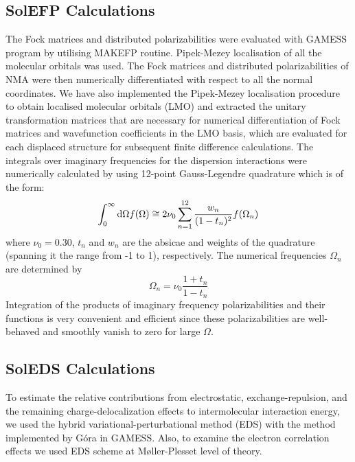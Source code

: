 \documentclass[b5paper,oneside,fleqn,11pt]{book}
\begin{document}
\begin{appendices}
\begin{refsection}
\subsection{SolEFP Calculations}

The Fock matrices and distributed polarizabilities were
evaluated with GAMESS program by utilising MAKEFP routine. \citep{GAMESS.JCC.1993}
Pipek\hyp{}Mezey localisation \citep{Pipek.Mezey.JCP.1989}
of all the molecular orbitals was
used. The Fock matrices and distributed polarizabilities of
NMA were then numerically differentiated with respect to all
the normal coordinates. We have also implemented the Pipek\hyp{}Mezey 
localisation procedure to obtain localised molecular
orbitals (LMO) and extracted the unitary transformation matrices
that are necessary for numerical differentiation of Fock
matrices and wavefunction coefficients in the LMO basis,
which are evaluated for each displaced structure for subsequent
finite difference calculations. 
The integrals over
imaginary frequencies for the dispersion interactions were
numerically calculated by using 12\hyp{}point Gauss\hyp{}Legendre
quadrature which is of the form: \citep{Adamovic.Gordon.MolPhys.2005}
%
\begin{equation}
 \int_0^\infty {\rm d}\Omega f(\Omega) \cong 2\nu_0\sum_{n=1}^{12} \frac{w_n}{(1-t_n)^2}f(\Omega_n)
\end{equation}
%
where $\nu_0=0.30$, $t_n$ and $w_n$ are the
absicae and weights of the quadrature (spanning it the
range from -1 to 1), respectively. 
The numerical
frequencies $\Omega_n$ are determined by 
%
\begin{equation}
 \Omega_n = \nu_0 \frac{1+t_n}{1-t_n}
\end{equation}
% 
Integration of the products of imaginary frequency
polarizabilities and their functions is very convenient
and efficient since
these polarizabilities are well\hyp{}behaved and
smoothly vanish to zero for large $\Omega$.

\subsection{SolEDS Calculations}

To estimate the relative contributions from electrostatic,
exchange\hyp{}repulsion, and the remaining charge\hyp{}delocalization
effects to intermolecular interaction energy, we
used the hybrid variational\hyp{}perturbational method (EDS) \citep{Sokalski.Roszak.Pecul.CPL.1988,
Chalasinski.Szczesniak.MolPhys.1988,Cybulski.Chalasinski.Moszynski.JCP.1990,
Gora.Bartkowiak.Roszak.Leszczynski.JCP.2004} 
with the
method implemented by G{\'o}ra \citep{Gora.EDS.1998-2010} 
in GAMESS. \citep{GAMESS.JCC.1993} 
Also, to examine the electron correlation effects 
we used EDS scheme at M{\o}ller\hyp{}Plesset level of theory.


\end{refsection}
\end{appendices}
\end{document}
